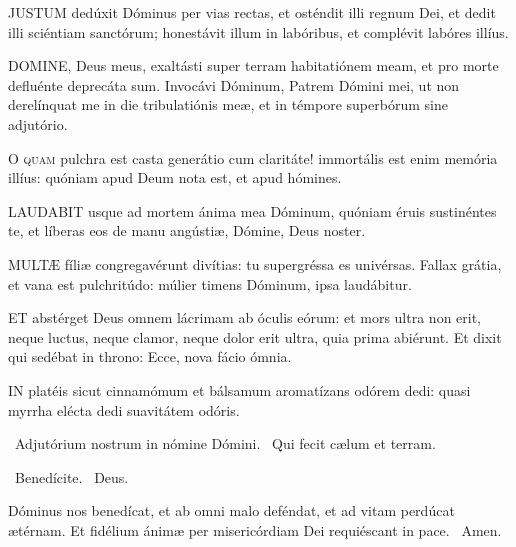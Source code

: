 \lettrine[lines=2]{J}{USTUM} dedúxit Dóminus per vias rectas, et osténdit illi regnum Dei, et dedit illi sciéntiam sanctórum; honestávit illum in labóribus, et complévit labóres illíus.


\lettrine[lines=2]{D}{OMINE}, Deus meus, exaltásti super terram habitatiónem meam, et pro morte defluénte deprecáta sum. Invocávi Dóminum, Patrem Dómini mei, ut non derelínquat me in die tribulatiónis meæ, et in témpore superbórum sine adjutório.


\lettrine[lines=2]{O}{} \textsc{quam} pulchra est casta generátio cum claritáte! immortális est enim memória illíus: quóniam apud Deum nota est, et apud hómines.


\lettrine[lines=2]{L}{AUDABIT} usque ad mortem ánima mea Dóminum, quóniam éruis sustinéntes te, et líberas eos de manu angústiæ, Dómine, Deus noster.


\lettrine[lines=2]{M}{ULTÆ} fíliæ congregavérunt divítias: tu supergréssa es univérsas. Fallax grátia, et vana est pulchritúdo: múlier timens Dóminum, ipsa laudábitur.


\lettrine[lines=2]{E}{T} abstérget Deus omnem lácrimam ab óculis eórum: et mors ultra non erit, neque luctus, neque clamor, neque dolor erit ultra, quia prima abiérunt. Et dixit qui sedébat in throno: Ecce, nova fácio ómnia.


\lettrine[lines=2]{I}{N} platéis sicut cinnamómum et bálsamum aromatízans odórem dedi: quasi myrrha elécta dedi suavitátem odóris.

\sectionornament

\V\ Adjutórium nostrum in nómine Dómini. \R\ Qui fecit cælum et terram.

\V\ Benedícite. \R\ Deus.

 Dóminus nos benedícat, et ab omni malo deféndat, et ad vitam perdúcat ætérnam. Et fidélium ánimæ per misericórdiam Dei requiéscant in pace. \R\ Amen.


